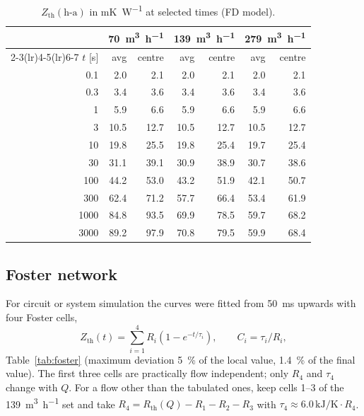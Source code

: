 \documentclass[11pt,a4paper]{article}
\newcommand{\Rth}{R_{\mathrm{th}}}
\newcommand{\Zth}{Z_{\mathrm{th}}}
\begin{document}
\begin{table}[htbp]
\centering\small
\caption{$\Zth(\mathrm{h\text{-}a})$ in \si{\milli\kelvin\per\watt} at selected times (FD model).}
\label{tab:zth}
\begin{tabular}{r rr rr rr}
\toprule
 & \multicolumn{2}{c}{\SI{70}{\cubic\metre\per\hour}} & \multicolumn{2}{c}{\SI{139}{\cubic\metre\per\hour}} & \multicolumn{2}{c}{\SI{279}{\cubic\metre\per\hour}} \\
\cmidrule(lr){2-3}\cmidrule(lr){4-5}\cmidrule(lr){6-7}
$t$ [s] & avg & centre & avg & centre & avg & centre \\
\midrule
0.1 & 2.0 & 2.1 & 2.0 & 2.1 & 2.0 & 2.1 \\
0.3 & 3.4 & 3.6 & 3.4 & 3.6 & 3.4 & 3.6 \\
1 & 5.9 & 6.6 & 5.9 & 6.6 & 5.9 & 6.6 \\
3 & 10.5 & 12.7 & 10.5 & 12.7 & 10.5 & 12.7 \\
10 & 19.8 & 25.5 & 19.8 & 25.4 & 19.7 & 25.4 \\
30 & 31.1 & 39.1 & 30.9 & 38.9 & 30.7 & 38.6 \\
100 & 44.2 & 53.0 & 43.2 & 51.9 & 42.1 & 50.7 \\
300 & 62.4 & 71.2 & 57.7 & 66.4 & 53.4 & 61.9 \\
1000 & 84.8 & 93.5 & 69.9 & 78.5 & 59.7 & 68.2 \\
3000 & 89.2 & 97.9 & 70.8 & 79.5 & 59.9 & 68.4 \\
\bottomrule
\end{tabular}
\end{table}

\subsection{Foster network}

For circuit or system simulation the curves were fitted from \SI{50}{\milli\second} upwards with four Foster cells,
\begin{equation}
\Zth(t)=\sum_{i=1}^{4} R_i\left(1-e^{-t/\tau_i}\right),\qquad C_i=\tau_i/R_i ,
\end{equation}
Table~\ref{tab:foster} (maximum deviation \SI{5}{\percent} of the local value, \SI{1.4}{\percent} of the final value). The first three cells are practically flow independent; only $R_4$ and $\tau_4$ change with $Q$. For a flow other than the tabulated ones, keep cells 1--3 of the \SI{139}{\cubic\metre\per\hour} set and take $R_4=\Rth(Q)-R_1-R_2-R_3$ with $\tau_4\approx 6.0\,\si{\kilo\joule\per\kelvin}\cdot R_4$.
\end{document}
